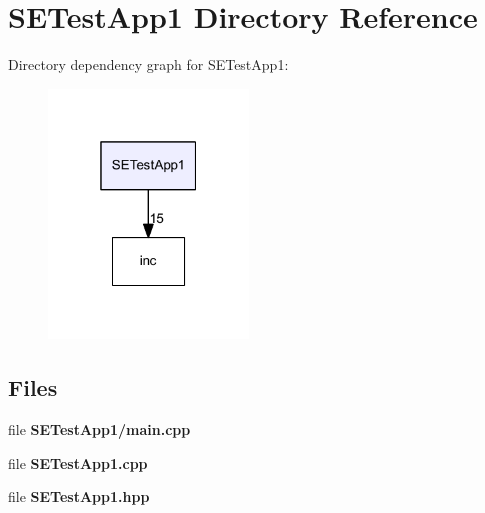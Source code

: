 \section{S\+E\+Test\+App1 Directory Reference}
\label{dir_132cb1778485dce6ea59966f5b15d875}
Directory dependency graph for S\+E\+Test\+App1\+:
\nopagebreak
\begin{figure}[H]
\begin{center}
\leavevmode
\includegraphics[width=151pt]{dir_132cb1778485dce6ea59966f5b15d875_dep}
\end{center}
\end{figure}
\subsection*{Files}
\begin{DoxyCompactItemize}
\item 
file {\bf S\+E\+Test\+App1/main.\+cpp}
\item 
file {\bf S\+E\+Test\+App1.\+cpp}
\item 
file {\bf S\+E\+Test\+App1.\+hpp}
\end{DoxyCompactItemize}
